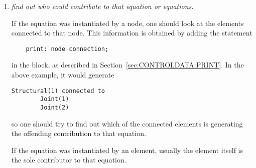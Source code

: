 \begin{enumerate}
\item \emph{find out who could contribute to that equation or equations.}

If the equation was instantiated by a node,
one should look at the elements connected to that node.
This information is obtained by adding the statement
\begin{verbatim}
    print: node connection;
\end{verbatim}
in the  block, as described
in Section~\ref{sec:CONTROLDATA:PRINT}.
In the above example, it would generate
\begin{verbatim}
Structural(1) connected to
        Joint(1)
        Joint(2)
\end{verbatim}
so one should try to find out which of the connected elements
is generating the offending contribution to that equation.

If the equation was instantiated by an element, usually the element
itself is the sole contributor to that equation.
\end{enumerate}

